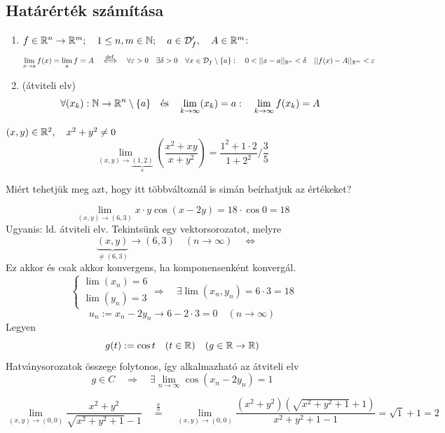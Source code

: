 \documentclass[a4paper,11.5pt]{article}
\begin{document}
	\subsection{Határérték számítása}
	\begin{revision}
		\begin{enumerate}
			\item $f\in\mathbb{R}^n\to\mathbb{R}^m;\quad 1\leq n,m\in\mathbb{N};\quad a\in\mathcal{D}_f',\quad A\in\mathbb{R}^m$:
			\[ \lim_{x\to a}f(x)=\lim_af=A\quad \overset{\text{def.}}{\Longleftrightarrow}\quad \forall\varepsilon>0\quad \exists\delta>0\quad \forall x\in\mathcal{D}_f\setminus\{a\}:\quad 0<||x-a||_{\R^n}<\delta\quad ||f(x)-A||_{\R^m}<\varepsilon \]
			\item (átviteli elv)\[ \forall (x_k):\mathbb{N}\to\mathbb{R}^n\setminus\{a\}\quad \text{és}\quad \lim_{k\to\infty}(x_k)=a:\quad \lim_{k\to\infty}f(x_k)=A \]
		\end{enumerate}
	\end{revision}
	\begin{task} $(x,y)\in\mathbb{R}^2,\quad x^2+y^2\not=0$
		\[ \lim_{(x,y)\to\underbrace{(1,2)}_{a}}\left(\frac{x^2+xy}{x+y^2}\right)=\frac{1^2+1\cdot2}{1+2^2}/\frac{3}{5} \]
	\end{task}
	Miért tehetjük meg azt, hogy itt többváltoznál is simán beírhatjuk az értékeket?
	\begin{task}
		\[ \lim_{(x,y)\to(6,3)}x\cdot y\cos(x-2y)=18\cdot\cos0=18 \]
		Ugyanis: ld. átviteli elv. Tekintsünk egy vektorsorozatot, melyre
		\[ \underbrace{(x,y)}_{\not=(6,3)}\to(6,3)\quad (n\to\infty)\quad \Leftrightarrow\quad  \]
		Ez akkor és csak akkor konvergens, ha komponensenként konvergál.
		\[\begin{cases}
			\lim(x_n)=6\\
			\lim(y_n)=3
		\end{cases} \Rightarrow\quad \exists\lim(x_n,y_n)=6\cdot3=18 \]
		\[ u_n:=x_n-2y_n\to 6-2\cdot3=0\quad (n\to\infty) \]
		Legyen 
		\[ g(t):=\cos t\quad (t\in\mathbb{R})\quad (g\in\mathbb{R}\to\mathbb{R}) \]
		Hatványsorozatok összege folytonos, így alkalmazható az átviteli elv
		\[ g\in C\quad \Rightarrow\quad \exists\lim_{n\to\infty}\cos(x_n-2y_n)=1 \]
	\end{task}
	\begin{task}
		\[ \lim_{(x,y)\to(0,0)}\frac{x^2+y^2}{\sqrt{x^2+y^2+1}-1}\quad \overset{\frac{0}{0}}{=}\quad \lim_{(x,y)\to(0,0)}\frac{(x^2+y^2)(\sqrt{x^2+y^2+1}+1)}{x^2+y^2+1-1}=\sqrt{1}+1=2 \]
	\end{task}
\end{document}
